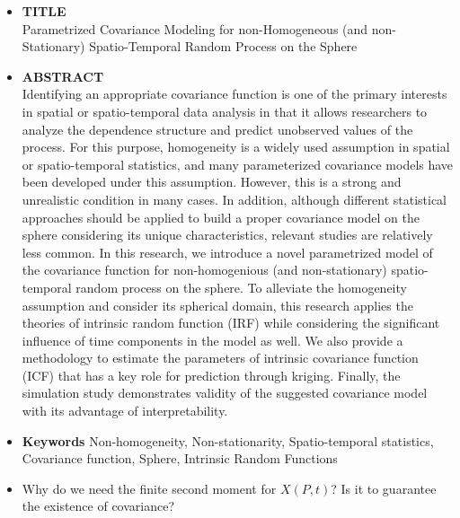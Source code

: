 \documentclass[11pt]{article}
\begin{document}

\begin{itemize}



\item \textbf{TITLE}\\
Parametrized Covariance Modeling for non-Homogeneous (and non-Stationary) Spatio-Temporal Random Process on the
Sphere\\

\item \textbf{ABSTRACT}\\
Identifying an appropriate covariance function is one of the primary interests in spatial or spatio-temporal data analysis in that it allows researchers to analyze the dependence structure and predict unobserved values of the process. For this purpose, homogeneity is a widely used assumption in spatial or spatio-temporal statistics, and many parameterized covariance models have been developed under this assumption. However, this is a strong and unrealistic condition in many cases. In addition, although different statistical approaches should be applied to build a proper covariance model on the sphere considering its unique characteristics, relevant studies are relatively less common. In this research, we introduce a novel parametrized model of the covariance function for non-homogenious (and non-stationary) spatio-temporal random process on the sphere. To alleviate the homogeneity assumption and consider its spherical domain, this research applies the theories of intrinsic random function (IRF) while considering the significant influence of time components in the model as well. We also provide a methodology to estimate the parameters of intrinsic covariance function (ICF) that has a key role for prediction through kriging. Finally, the simulation study demonstrates validity of the suggested covariance model with its advantage of interpretability.\\

\item
\textbf{Keywords } Non-homogeneity, Non-stationarity, Spatio-temporal statistics, Covariance function, Sphere, Intrinsic Random Functions\\

\pagebreak

\item Why do we need the finite second moment for $X(P,t)$? Is it to guarantee the existence of covariance?\\


\end{itemize}
\end{document}
